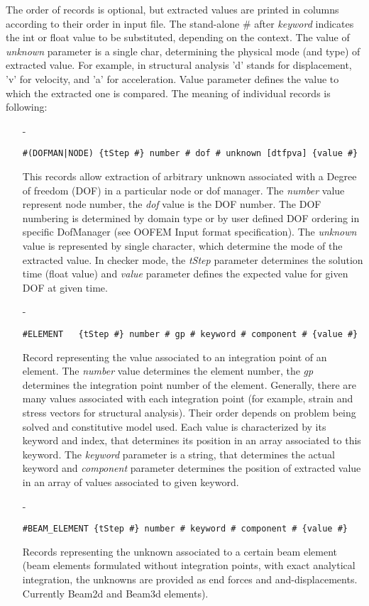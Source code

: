 \documentclass[a4paper]{article}
\begin{document}
The order of records is optional, but extracted values are printed in
columns according to their order in input file. The stand-alone \#
after {\em keyword} indicates the int or float value to be substituted, depending on the context. The value of {\em
unknown} parameter is a single char, determining the physical mode (and type) of extracted value.
For example, in structural analysis 'd' stands for displacement, 'v' for velocity, and 'a' for acceleration.
Value parameter defines the value to which the extracted one is compared.  
The meaning of individual records is following:
\begin{itemize}
\item[-]
\begin{verbatim}
#(DOFMAN|NODE) {tStep #} number # dof # unknown [dtfpva] {value #}
\end{verbatim}
This records allow extraction of arbitrary unknown associated with
a Degree of freedom (DOF) in a particular node or dof manager.
The {\em number} value represent node number, the {\em
dof} value is the DOF number. The DOF numbering is determined
by domain type or by user defined DOF ordering in specific
DofManager (see OOFEM Input format specification). The {\em unknown} value
is represented by single character, which determine the mode of the
extracted value. In checker mode, the {\em tStep} parameter determines the solution time (float value) and {\em value} parameter defines the expected value for given DOF at given time.


\item[-]
\begin{verbatim}
#ELEMENT   {tStep #} number # gp # keyword # component # {value #}
\end{verbatim}
Record representing the value associated to an integration point of
an element. The {\em number} value determines the element number, the {\em
gp} determines the integration point number of the element. 
Generally, there are many values associated with each integration point 
(for example, strain and stress vectors for structural
analysis). Their order depends on problem being solved and
constitutive model used. Each value is characterized by its keyword and index, 
that determines its position in an array associated to this keyword.
The {\em keyword} parameter is a string, that determines the actual keyword
and {\em component} parameter determines the position of extracted value in an 
array of values associated to given keyword.

\item[-]
\begin{verbatim}
#BEAM_ELEMENT {tStep #} number # keyword # component # {value #}
\end{verbatim}
Records representing the unknown associated to a certain beam
element (beam elements formulated without integration points, with
exact analytical integration, the unknowns are provided as end forces
and and-displacements. Currently Beam2d and Beam3d elements). 


\end{itemize}
\end{document}
